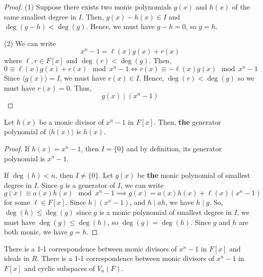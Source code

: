 \begin{proof}
    (1) Suppose
    there exists two monic polynomials $ g(x) $ and $ h(x) $
    of the same smallest degree in $ I $.
    Then, $ g(x)-h(x)\in I $ and $ \deg(g-h)<\deg (g) $. Hence, we must
    have $ g-h=0 $, so $ g=h $.

    (2) We can write
    \[ x^n-1=\ell(x)g(x)+r(x) \]
    where $ \ell,r\in F[x] $ and $ \deg(r)<\deg(g) $. Then,
    \[ 0\equiv \ell (x)g(x)+r(x)\mod x^n-1\iff r(x)\equiv -\ell(x)g(x)\mod x^n-1 \]
    Since $ \langle g(x)\rangle = I $, we must have $ r(x)\in I $.
    Hence, $ \deg(r)<\deg(g) $ so we must have $ r(x)=0 $. Thus,
    \[ g(x)\mid (x^n-1) \]
\end{proof}

\begin{thmbox}
    \begin{theorem}
        Let $ h(x) $ be a monic divisor of $ x^n-1 $ in $ F[x] $.
        Then, \textbf{the} generator polynomial of $ \langle h(x)\rangle $
        is $ h(x) $.
    \end{theorem}
\end{thmbox}

\begin{proof}
    If $ h(x)=x^n-1 $, then $ I=\{0\} $ and by definition, its
    generator polynomial is $ x^n-1 $.

    If $ \deg(h)<n $, then $ I\neq \{0\} $. Let $ g(x) $
    be \textbf{the} monic polynomial of smallest degree in $ I $.
    Since $ g $ is a generator of $ I $, we can write
    \[ g(x)\equiv a(x)h(x)\mod x^n-1\implies g(x)=a(x)h(x)+\ell(x)(x^n-1) \]
    for some $ \ell\in F[x] $. Since $ h\mid (x^n-1) $, and $ h\mid ah $,
    we have $ h\mid g $. So, $ \deg(h)\leqslant \deg(g) $ since
    $ g $ is a monic polynomial of smallest degree in $ I $,
    we must have $ \deg(g)\leqslant \deg(h) $, so $ \deg(g)=\deg(h) $.
    Since $ g $ and $ h $ are both monic, we have
    $ g=h $.
\end{proof}

\begin{thmbox}
    \begin{corollary}
        There is a 1-1 correspondence between monic
        divisors of $ x^n-1 $ in $ F[x] $ and ideals in $ R $.
        There is a 1-1 correspondence between monic
        divisors of $ x^n-1 $ in $ F[x] $ and cyclic
        subspaces of $ V_n(F) $.
    \end{corollary}
\end{thmbox}

